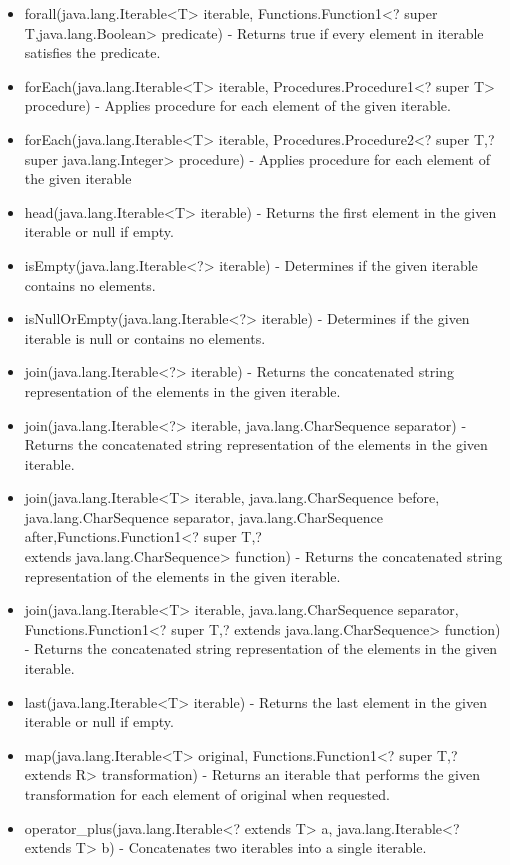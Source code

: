 \begin{itemize}
	\item forall(java.lang.Iterable<T> iterable, Functions.Function1<? super T,java.lang.Boolean> predicate) - Returns true if every element in iterable satisfies the predicate.
	\item forEach(java.lang.Iterable<T> iterable, Procedures.Procedure1<? super T> procedure) - Applies procedure for each element of the given iterable.
	\item forEach(java.lang.Iterable<T> iterable, Procedures.Procedure2<? super T,? super java.lang.Integer> procedure) - Applies procedure for each element of the given iterable
	\item head(java.lang.Iterable<T> iterable) - Returns the first element in the given iterable or null if empty.
	\item isEmpty(java.lang.Iterable<?> iterable) - Determines if the given iterable contains no elements.
	\item isNullOrEmpty(java.lang.Iterable<?> iterable) - Determines if the given iterable is null or contains no elements.
	\item join(java.lang.Iterable<?> iterable) - Returns the concatenated string representation of the elements in the given iterable.
	\item join(java.lang.Iterable<?> iterable, java.lang.CharSequence separator) - Returns the concatenated string representation of the elements in the given iterable.
	\item join(java.lang.Iterable<T> iterable, java.lang.CharSequence before, java.lang.CharSequence separator, java.lang.CharSequence after,Functions.Function1<? super T,? \\extends java.lang.CharSequence> function) - Returns the concatenated string representation of the elements in the given iterable.
	\item join(java.lang.Iterable<T> iterable, java.lang.CharSequence separator, Functions.Function1<? super T,? extends java.lang.CharSequence> function) - Returns the concatenated string representation of the elements in the given iterable.
	\item last(java.lang.Iterable<T> iterable) - Returns the last element in the given iterable or null if empty.
	\item map(java.lang.Iterable<T> original, Functions.Function1<? super T,? extends R> transformation) - Returns an iterable that performs the given transformation for each element of original when requested.
	\item operator\_plus(java.lang.Iterable<? extends T> a, java.lang.Iterable<? extends T> b) - Concatenates two iterables into a single iterable.

\end{itemize}
